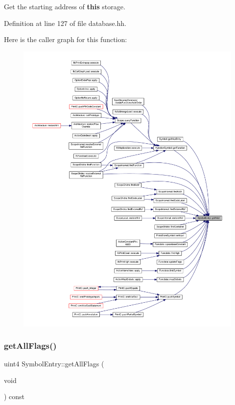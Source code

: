 Get the starting address of {\bfseries{this}} storage. 



Definition at line 127 of file database.\+hh.

Here is the caller graph for this function\+:
\nopagebreak
\begin{figure}[H]
\begin{center}
\leavevmode
\includegraphics[width=350pt]{class_symbol_entry_ae4bfe9ecfa78228978b247479554db80_icgraph}
\end{center}
\end{figure}
\mbox{\label{class_symbol_entry_a2a9a19cc7c6bfa573fd244bcc061a4a4}} 
\subsubsection{\texorpdfstring{getAllFlags()}{getAllFlags()}}
{\footnotesize\ttfamily uint4 Symbol\+Entry\+::get\+All\+Flags (\begin{DoxyParamCaption}\item[{void}]{ }\end{DoxyParamCaption}) const\hspace{0.3cm}{\ttfamily [inline]}}




